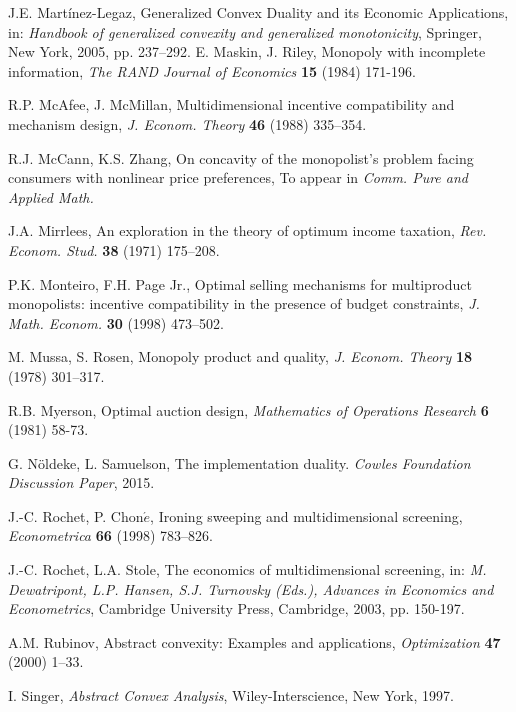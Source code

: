 \documentclass[a4paper, 11pt]{amsart}
\numberwithin{equation}{section}
\theoremstyle{plain}
\theoremstyle{definition}
\theoremstyle{remark}
\begin{document}
\begin{thebibliography}{BCDE}
	
{ 
	J.E. Martínez-Legaz, 
	Generalized Convex Duality and its Economic Applications, in: 
	{\em Handbook of generalized convexity and generalized monotonicity}, Springer, New York, 2005, pp. 237--292.	
}
{
	E. Maskin, J. Riley, 
	Monopoly with incomplete information, 
	{\em The RAND Journal of Economics} {\bf 15} (1984) 171-196.
}	
	

	
	R.P. McAfee, J. McMillan, 
	Multidimensional incentive compatibility and mechanism design, 
	{\em J. Econom. Theory} {\bf 46} (1988) 335–354.
		
	R.J. McCann, K.S. Zhang,
	On concavity of the monopolist's problem facing consumers with nonlinear price preferences,
	To appear in {\em Comm. Pure and Applied Math.}
		
	J.A. Mirrlees, 
	An exploration in the theory of optimum income taxation, 
	{\em Rev. Econom. Stud.} {\bf 38} (1971) 175–208.
	

	P.K. Monteiro, F.H. Page Jr., 
	Optimal selling mechanisms for multiproduct monopolists: incentive compatibility in the presence of budget constraints, 
	{\em J. Math. Econom.} {\bf 30} (1998) 473–502.


	M. Mussa, S. Rosen, 
	Monopoly product and quality, 
	{\em J. Econom. Theory} {\bf 18} (1978) 301–317.

{
	R.B. Myerson, 
	Optimal auction design, 
	{\em  Mathematics of Operations Research} {\bf 6} (1981) 58-73.
}

	G. N\"oldeke, L. Samuelson, 
	The implementation duality. 
	{\em Cowles Foundation Discussion Paper}, 2015.	


	J.-C. Rochet, P. Chon$\acute{e}$, 
	Ironing sweeping and multidimensional screening, 
	{\em Econometrica} {\bf 66} (1998) 783–826.
	
	J.-C. Rochet, L.A. Stole, 
	The economics of multidimensional screening, in: 
	{\em M. Dewatripont, L.P. Hansen, S.J. Turnovsky (Eds.),  Advances in Economics and Econometrics}, Cambridge University Press, Cambridge, 2003, pp. 150-197.
	
{	 
	A.M. Rubinov, 
	Abstract convexity: Examples and applications, 
	{\em Optimization} {\bf 47} (2000)  1–33. 
}

{ 
	I. Singer, 
	{\em Abstract Convex Analysis}, Wiley-Interscience, New York, 1997.
}


\end{thebibliography}
\end{document}
